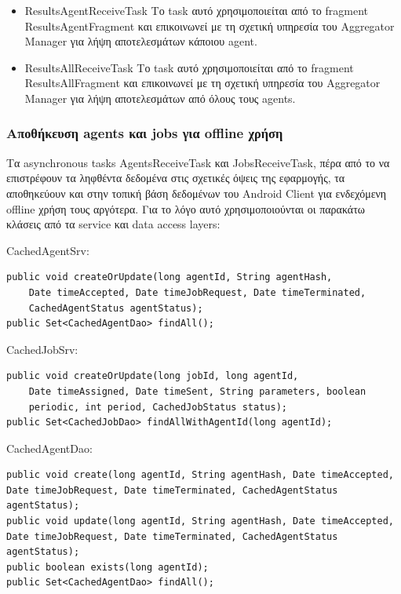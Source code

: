 \documentclass[a4paper,11pt]{article}
\begin{document}
\begin{sloppypar}
\begin{itemize}
\item ResultsAgentReceiveTask
\newline
Το task αυτό χρησιμοποιείται από το fragment ResultsAgentFragment και επικοινωνεί με τη σχετική υπηρεσία του Aggregator Manager για λήψη αποτελεσμάτων κάποιου agent.

\item ResultsAllReceiveTask
\newline
Το task αυτό χρησιμοποιείται από το fragment ResultsAllFragment και επικοινωνεί με τη σχετική υπηρεσία του Aggregator Manager για λήψη αποτελεσμάτων από όλους τους agents.

\end{itemize}

\newpage

\subsubsection{Αποθήκευση agents και jobs για offline χρήση}

Τα asynchronous tasks AgentsReceiveTask και JobsReceiveTask, πέρα από το να επιστρέφουν τα ληφθέντα δεδομένα στις σχετικές όψεις της εφαρμογής, τα αποθηκεύουν και στην τοπική βάση δεδομένων του Android Client για ενδεχόμενη offline χρήση τους αργότερα. Για το λόγο αυτό χρησιμοποιούνται οι παρακάτω κλάσεις από τα service και data access layers:

CachedAgentSrv:
\begin{lstlisting}
public void createOrUpdate(long agentId, String agentHash,
    Date timeAccepted, Date timeJobRequest, Date timeTerminated,
    CachedAgentStatus agentStatus);
public Set<CachedAgentDao> findAll();
\end{lstlisting}

CachedJobSrv:
\begin{lstlisting}
public void createOrUpdate(long jobId, long agentId,
    Date timeAssigned, Date timeSent, String parameters, boolean
    periodic, int period, CachedJobStatus status);
public Set<CachedJobDao> findAllWithAgentId(long agentId);
\end{lstlisting}

CachedAgentDao:

\begin{lstlisting}
public void create(long agentId, String agentHash, Date timeAccepted, Date timeJobRequest, Date timeTerminated, CachedAgentStatus agentStatus);
public void update(long agentId, String agentHash, Date timeAccepted, Date timeJobRequest, Date timeTerminated, CachedAgentStatus agentStatus);
public boolean exists(long agentId);
public Set<CachedAgentDao> findAll();
\end{lstlisting}


\end{sloppypar}
\end{document}
